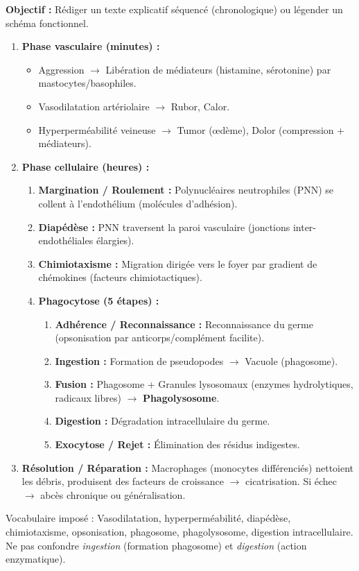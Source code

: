 \documentclass[11pt]{article}
\newcommand{\cle}[1]{{\popxbold\color{popdark}#1}}
\begin{document}
\begin{methode}
\textbf{Objectif :} Rédiger un texte explicatif séquencé (chronologique) ou légender un schéma fonctionnel.
\begin{enumerate}
 \item \textbf{Phase vasculaire (minutes) :} 
 \begin{itemize}
 \item Aggression $\rightarrow$ Libération de médiateurs (histamine, sérotonine) par mastocytes/basophiles.
 \item Vasodilatation artériolaire $\rightarrow$ Rubor, Calor.
 \item Hyperperméabilité veineuse $\rightarrow$ Tumor (œdème), Dolor (compression + médiateurs).
 \end{itemize}
 \item \textbf{Phase cellulaire (heures) :}
 \begin{enumerate}
 \item \textbf{Margination / Roulement :} Polynucléaires neutrophiles (PNN) se collent à l'endothélium (molécules d'adhésion).
 \item \textbf{Diapédèse :} PNN traversent la paroi vasculaire (jonctions inter-endothéliales élargies).
 \item \textbf{Chimiotaxisme :} Migration dirigée vers le foyer par gradient de chémokines (facteurs chimiotactiques).
 \item \textbf{Phagocytose (5 étapes) :}
 \begin{enumerate}
 \item \textbf{Adhérence / Reconnaissance :} Reconnaissance du germe (opsonisation par anticorps/complément facilite).
 \item \textbf{Ingestion :} Formation de pseudopodes $\rightarrow$ Vacuole (phagosome).
 \item \textbf{Fusion :} Phagosome + Granules lysosomaux (enzymes hydrolytiques, radicaux libres) $\rightarrow$ \textbf{Phagolysosome}.
 \item \textbf{Digestion :} Dégradation intracellulaire du germe.
 \item \textbf{Exocytose / Rejet :} Élimination des résidus indigestes.
 \end{enumerate}
 \end{enumerate}
 \item \textbf{Résolution / Réparation :} Macrophages (monocytes différenciés) nettoient les débris, produisent des facteurs de croissance $\rightarrow$ cicatrisation. Si échec $\rightarrow$ abcès chronique ou généralisation.
\end{enumerate}
\cle{Vocabulaire imposé :} Vasodilatation, hyperperméabilité, diapédèse, chimiotaxisme, opsonisation, phagosome, phagolysosome, digestion intracellulaire. Ne pas confondre \emph{ingestion} (formation phagosome) et \emph{digestion} (action enzymatique).
\end{methode}
\end{document}
